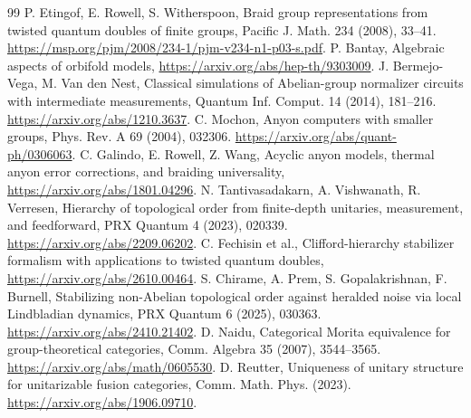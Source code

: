 \documentclass[11pt]{amsart}
\theoremstyle{definition}\newtheorem{definition}[theorem]{Definition}
\begin{document}
\begin{thebibliography}{99}
 P. Etingof, E. Rowell, S. Witherspoon, Braid group representations
from twisted quantum doubles of finite groups, Pacific J. Math. 234 (2008), 33--41.
\url{https://msp.org/pjm/2008/234-1/pjm-v234-n1-p03-s.pdf}.
 P. Bantay, Algebraic aspects of orbifold models,
\url{https://arxiv.org/abs/hep-th/9303009}.
 J. Bermejo-Vega, M. Van den Nest, Classical simulations of
Abelian-group normalizer circuits with intermediate measurements,
Quantum Inf. Comput. 14 (2014), 181--216.
\url{https://arxiv.org/abs/1210.3637}.
 C. Mochon, Anyon computers with smaller groups,
Phys. Rev. A 69 (2004), 032306. \url{https://arxiv.org/abs/quant-ph/0306063}.
 C. Galindo, E. Rowell, Z. Wang, Acyclic anyon models,
thermal anyon error corrections, and braiding universality,
\url{https://arxiv.org/abs/1801.04296}.
 N. Tantivasadakarn, A. Vishwanath, R. Verresen,
Hierarchy of topological order from finite-depth unitaries, measurement,
and feedforward, PRX Quantum 4 (2023), 020339.
\url{https://arxiv.org/abs/2209.06202}.
 C. Fechisin et al., Clifford-hierarchy stabilizer formalism
with applications to twisted quantum doubles,
\url{https://arxiv.org/abs/2610.00464}.
 S. Chirame, A. Prem, S. Gopalakrishnan, F. Burnell,
Stabilizing non-Abelian topological order against heralded noise via local
Lindbladian dynamics, PRX Quantum 6 (2025), 030363.
\url{https://arxiv.org/abs/2410.21402}.
 D. Naidu, Categorical Morita equivalence for group-theoretical
categories, Comm. Algebra 35 (2007), 3544--3565.
\url{https://arxiv.org/abs/math/0605530}.
 D. Reutter, Uniqueness of unitary structure for unitarizable
fusion categories, Comm. Math. Phys. (2023).
\url{https://arxiv.org/abs/1906.09710}.
\end{thebibliography}
\end{document}
